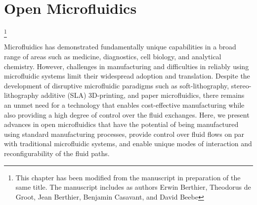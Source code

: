 \chapter{Open Microfluidics}\footnote{This chapter has been modified from the manuscript in preparation of the same title. The manuscript includes as authors Erwin Berthier, Theodorus de Groot, Jean Berthier, Benjamin Casavant, and David Beebe}
\label{Chap:OpenMicrofluidics}


Microfluidics has demonstrated fundamentally unique capabilities in a broad range of areas such as medicine, diagnostics, cell biology, and analytical chemistry. However, challenges in manufacturing and difficulties in reliably using microfluidic systems limit their widespread adoption and translation. Despite the development of disruptive microfluidic paradigms such as soft-lithography, stereo-lithography additive (SLA) 3D-printing, and paper microfluidics, there remains an unmet need for a technology that enables cost-effective manufacturing while also providing a high degree of control over the fluid exchanges. Here, we present advances in open microfluidics that have the potential of being manufactured using standard manufacturing processes, provide control over fluid flows on par with traditional microfluidic systems, and enable unique modes of interaction and reconfigurability of the fluid paths.


